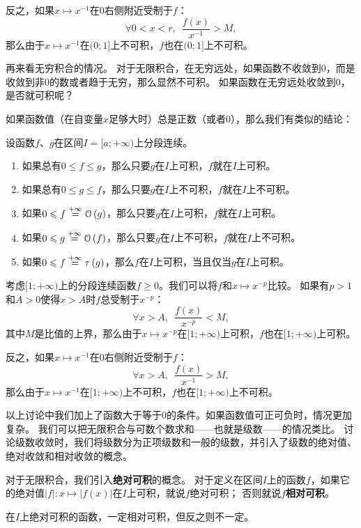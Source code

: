 \documentclass[12pt,UTF8,fontset=none]{ctexbook}
\begin{document}
反之，如果$x\mapsto x^{-1}$在$0$右侧附近受制于$f$：
$$ \forall 0<x<r ,\,\,\,\frac{f(x)}{x^{-1}} > M,$$
那么由于$x\mapsto x^{-1}$在$(0;1]$上不可积，$f$也在$(0;1]$上不可积。

再来看无穷积合的情况。
对于无限积合，在无穷远处，如果函数不收敛到$0$，而是收敛到非$0$的数或者趋于无穷，那么显然不可积。
如果函数在无穷远处收敛到$0$，是否就可积呢？

如果函数值（在自变量$x$足够大时）总是正数（或者$0$），那么我们有类似的结论：
\begin{tm}
    设函数$f$、$g$在区间$I=[a;+\infty)$上分段连续。
    \begin{enumerate}
        \item 如果总有$0\leqslant f \leqslant g$，那么只要$g$在$I$上可积，$f$就在$I$上可积。
        \item 如果总有$0\leqslant g \leqslant f$，那么只要$g$在$I$上不可积，$f$就在$I$上不可积。
        \item 如果$0\leqslant f \overset{+\infty}{=} \mathcal{O}\left(g\right)$，那么只要$g$在$I$上可积，$f$就在$I$上可积。
        \item 如果$0\leqslant g \overset{+\infty}{=} \mathcal{O}\left(f\right)$，那么只要$g$在$I$上不可积，$f$就在$I$上不可积。
        \item 如果$0\leqslant f \overset{+\infty}{=} \tau\left(g\right)$，那么$f$在$I$上可积，当且仅当$g$在$I$上可积。
    \end{enumerate}
\end{tm}

考虑$[1;+\infty)$上的分段连续函数$f\geqslant 0$。我们可以将$f$和$x\mapsto x^{-p}$比较。
如果有$p>1$和$A>0$使得$x>A$时$f$总受制于$x^{-p}$：
$$ \forall x>A ,\,\,\,\frac{f(x)}{x^{-p}} < M,$$
其中$M$是比值的上界，那么由于$x\mapsto x^{-p}$在$[1;+\infty)$上可积，$f$也在$[1;+\infty)$上可积。

反之，如果$x\mapsto x^{-1}$在$0$右侧附近受制于$f$：
$$ \forall x>A ,\,\,\,\frac{f(x)}{x^{-1}} > M,$$
那么由于$x\mapsto x^{-1}$在$[1;+\infty)$上不可积，$f$也在$[1;+\infty)$上不可积。

以上讨论中我们加上了函数大于等于$0$的条件。如果函数值可正可负时，情况更加复杂。
我们可以把无限积合与可数个数求和——也就是级数——的情况类比。
讨论级数收敛时，我们将级数分为正项级数和一般的级数，并引入了级数的绝对值、绝对收敛和相对收敛的概念。

对于无限积合，我们引入\textbf{绝对可积}的概念。
对于定义在区间$I$上的函数$f$，如果它的绝对值$|f|: x\mapsto |f(x)|$在$I$上可积，就说$f$绝对可积；
否则就说$f$\textbf{相对可积}。

在$I$上绝对可积的函数，一定相对可积，但反之则不一定。
\end{document}
